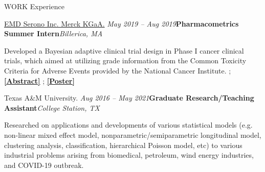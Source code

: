 \documentclass{resume} %
\begin{document}
\begin{rSection}{WORK Experience}


\begin{rSubsection}{
\href{https://www.emdserono.com/us-en}{EMD Serono Inc. Merck KGaA.}
}{\em May 2019 -- Aug 2019}{\textbf{Pharmacometrics Summer Intern}}{\em Billerica, MA}
\item 
Developed a Bayesian adaptive clinical trial design in Phase I cancer clinical trials, which aimed at utilizing grade information from the Common Toxicity Criteria for Adverse Events provided by the National Cancer Institute. ; 
\href{https://sites.google.com/view/seyoonlee/home/projects/merck-group-summer-internship-project?authuser=0#h.lnkjghpa5ikt}
{\underline{\textbf{[Abstract]}}}
;
\href{https://www.dropbox.com/s/dnlynbzl6ojmgwh/ACOP_Se_Yoon_Lee_PhD.pdf?dl=0}
{\underline{\textbf{[Poster]}}}
\end{rSubsection}


\begin{rSubsection}{Texas A\&M University.
}{\em Aug 2016 -- May 2021}{\textbf{Graduate Research/Teaching Assistant}}{\em College Station, TX}
\item 
Researched on applications and developments of various statistical models (e.g. non-linear mixed effect model, nonparametric/semiparametric longitudinal model, clustering analysis, classification, hierarchical Poisson model, etc) to various industrial problems arising from biomedical, petroleum, wind energy industries, and COVID-19 outbreak.
\end{rSubsection}


\end{rSection}

\end{document}

